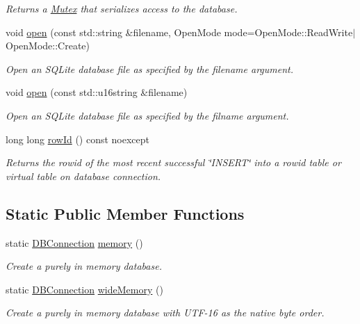 \begin{DoxyCompactItemize}
\begin{DoxyCompactList}\small\item\em Returns a \hyperlink{a00005}{Mutex} that serializes access to the database. \end{DoxyCompactList}\item 
void \hyperlink{a00002_aec696fc408d91e582d16727adff82445}{open} (const std\-::string \&filename, Open\-Mode mode=Open\-Mode\-::\-Read\-Write$\vert$Open\-Mode\-::\-Create)
\begin{DoxyCompactList}\small\item\em Open an S\-Q\-Lite database file as specified by the filename argument. \end{DoxyCompactList}\item 
void \hyperlink{a00002_ab5f3dbc9164bd435f6770f8625c0a79c}{open} (const std\-::u16string \&filename)
\begin{DoxyCompactList}\small\item\em Open an S\-Q\-Lite database file as specified by the filname argument. \end{DoxyCompactList}\item 
long long \hyperlink{a00002_a0959fda218112d849700b7a9b58e0505}{row\-Id} () const noexcept
\begin{DoxyCompactList}\small\item\em Returns the rowid of the most recent successful \char`\"{}\-I\-N\-S\-E\-R\-T\char`\"{} into a rowid table or virtual table on database connection. \end{DoxyCompactList}\end{DoxyCompactItemize}
\subsection*{Static Public Member Functions}
\begin{DoxyCompactItemize}
\item 
static \hyperlink{a00002}{D\-B\-Connection} \hyperlink{a00002_a5bd49a76155ffede0dca70f54c794159}{memory} ()
\begin{DoxyCompactList}\small\item\em Create a purely in memory database. \end{DoxyCompactList}\item 
static \hyperlink{a00002}{D\-B\-Connection} \hyperlink{a00002_a40beb5c2c30cd861a8b7c743b5e8881e}{wide\-Memory} ()
\begin{DoxyCompactList}\small\item\em Create a purely in memory database with U\-T\-F-\/16 as the native byte order. \end{DoxyCompactList}\end{DoxyCompactItemize}


